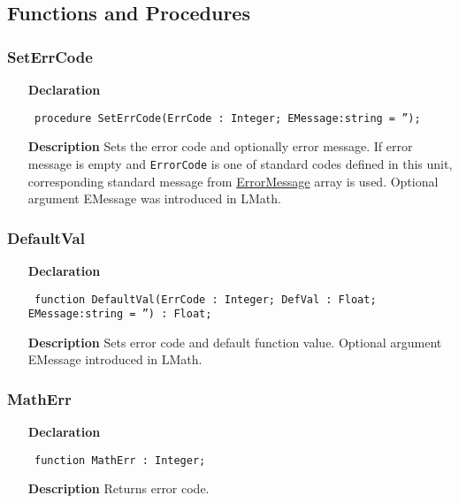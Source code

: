 \documentclass[12pt,a4paper,oneside]{report}
\newcommand{\lmath}[1]{   %
	\marginpar{\vspace{#1} 
		\begin{flushright}
			LMath
	\end{flushright} }
}
\newcommand{\declarationitem}[1]{\textbf{#1}}
\newcommand{\descriptiontitle}[1]{\textbf{#1}}
\newcommand{\code}[1]{\texttt{#1}}
\begin{document}
\subsection{Functions and Procedures}
\subsubsection{SetErrCode}\lmath{-24pt}
\label{uErrors-SetErrCode}
\begin{itemize}\item[\declarationitem{Declaration}\hfill]
	\begin{flushleft}
		\code{
			procedure SetErrCode(ErrCode : Integer; EMessage:string = '');}
	\end{flushleft}
	\item[\descriptiontitle{Description}]
	Sets the error code and optionally error message. If error message is empty and \code{ErrorCode} is one of standard codes 
defined in this unit, corresponding standard message from \hyperref[uErrors-ErrorMessage]{ErrorMessage} array is used. Optional argument EMessage was introduced in LMath.
\end{itemize}
\subsubsection{DefaultVal}\lmath{-24pt}
\label{uErrors-DefaultVal}
\begin{itemize}\item[\declarationitem{Declaration}\hfill]
	\begin{flushleft}
		\code{
			function DefaultVal(ErrCode : Integer; DefVal : Float; EMessage:string = '') : Float;}
		
	\end{flushleft}
	
	\par
	\item[\descriptiontitle{Description}]
	Sets error code and default function value. Optional argument EMessage introduced in LMath.
\end{itemize}
\subsubsection{MathErr}
\label{uErrors-MathErr}
\begin{itemize}\item[\declarationitem{Declaration}\hfill]
	\begin{flushleft}
		\code{
			function MathErr : Integer;}
	\end{flushleft}
	\item[\descriptiontitle{Description}]
	Returns error code.
\end{itemize}
\end{document}
